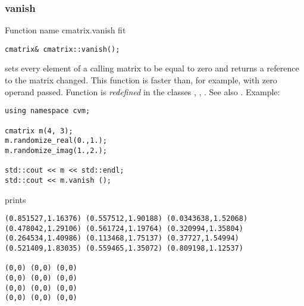 \subsubsection{vanish}
Function%
\pdfdest name {cmatrix.vanish} fit
\begin{verbatim}
cmatrix& cmatrix::vanish();
\end{verbatim}
sets every element of a calling matrix to be equal to zero
and returns a reference to
the matrix changed. This function is faster
than, for example,
with zero operand passed.
Function is \emph{redefined} in the classes
, ,
.
See also .
Example:
\begin{Verbatim}
using namespace cvm;

cmatrix m(4, 3);
m.randomize_real(0.,1.);
m.randomize_imag(1.,2.);

std::cout << m << std::endl;
std::cout << m.vanish ();
\end{Verbatim}
prints
\begin{Verbatim}
(0.851527,1.16376) (0.557512,1.90188) (0.0343638,1.52068)
(0.478042,1.29106) (0.561724,1.19764) (0.320994,1.35804)
(0.264534,1.40986) (0.113468,1.75137) (0.37727,1.54994)
(0.521409,1.83035) (0.559465,1.35072) (0.809198,1.12537)

(0,0) (0,0) (0,0)
(0,0) (0,0) (0,0)
(0,0) (0,0) (0,0)
(0,0) (0,0) (0,0)
\end{Verbatim}
\newpage



